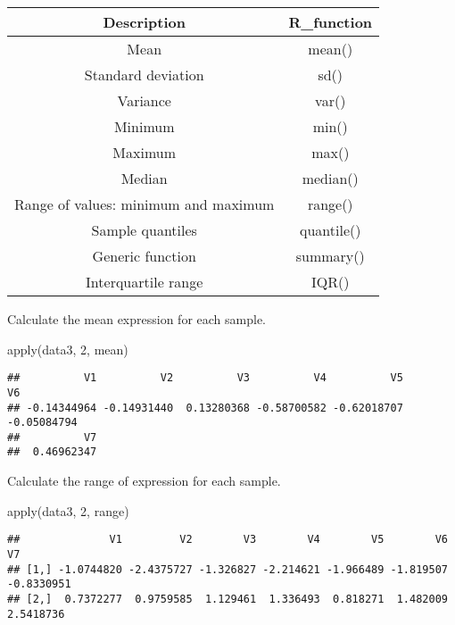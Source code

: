 \documentclass[
]{article}
\newenvironment{Shaded}{\begin{snugshade}}{\end{snugshade}}
\newcommand{\DecValTok}[1]{\textcolor[rgb]{0.00,0.00,0.81}{#1}}
\newcommand{\FunctionTok}[1]{\textcolor[rgb]{0.00,0.00,0.00}{#1}}
\newcommand{\NormalTok}[1]{#1}
\begin{document}
\begin{table}
\centering
\begin{tabular}{c|c}
\hline
Description & R\_function\\
\hline
Mean & mean()\\
\hline
Standard deviation & sd()\\
\hline
Variance & var()\\
\hline
Minimum & min()\\
\hline
Maximum & max()\\
\hline
Median & median()\\
\hline
Range of values: minimum and maximum & range()\\
\hline
Sample quantiles & quantile()\\
\hline
Generic function & summary()\\
\hline
Interquartile range & IQR()\\
\hline
\end{tabular}
\end{table}

Calculate the mean expression for each sample.

\begin{Shaded}
\begin{Highlighting}[]
\FunctionTok{apply}\NormalTok{(data3, }\DecValTok{2}\NormalTok{, mean)}
\end{Highlighting}
\end{Shaded}

\begin{verbatim}
##          V1          V2          V3          V4          V5          V6 
## -0.14344964 -0.14931440  0.13280368 -0.58700582 -0.62018707 -0.05084794 
##          V7 
##  0.46962347
\end{verbatim}

Calculate the range of expression for each sample.

\begin{Shaded}
\begin{Highlighting}[]
\FunctionTok{apply}\NormalTok{(data3, }\DecValTok{2}\NormalTok{, range)}
\end{Highlighting}
\end{Shaded}

\begin{verbatim}
##              V1         V2        V3        V4        V5        V6         V7
## [1,] -1.0744820 -2.4375727 -1.326827 -2.214621 -1.966489 -1.819507 -0.8330951
## [2,]  0.7372277  0.9759585  1.129461  1.336493  0.818271  1.482009  2.5418736
\end{verbatim}
\end{document}
